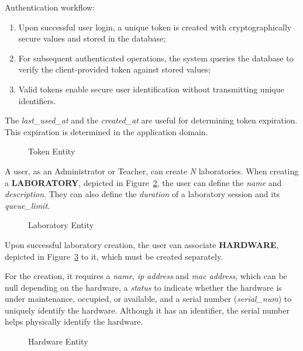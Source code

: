 Authentication workflow:

\begin{enumerate}
    \item Upon successful user login, a unique token is created with cryptographically secure values and stored in the database;
    \item For subsequent authenticated operations, the system queries the database to verify the client-provided token against stored values;
    \item Valid tokens enable secure user identification without transmitting unique identifiers.
\end{enumerate}

The \textit{last\_used\_at} and the \textit{created\_at} are useful for determining token expiration. This expiration is determined in the application domain.

\begin{figure}[H]
    \centering
    
    \caption{Token Entity}
    \label{fig:token_entity}
\end{figure}

A user, as an Administrator or Teacher, can create \textit{N} laboratories. When creating a \textbf{LABORATORY}, depicted in Figure~\ref{fig:laboratory_entity}, the user can define the \textit{name} and \textit{description}. They can also define the \textit{duration} of a laboratory session and its \textit{queue\_limit}.

\begin{figure}[H]
    \centering
    
    \caption{Laboratory Entity}
    \label{fig:laboratory_entity}
\end{figure}

Upon successful laboratory creation, the user can associate \textbf{HARDWARE}, depicted in Figure~\ref{fig:hardware_entity} to it, which must be created separately.

For the creation, it requires a \textit{name}, \textit{\ac{ip} address} and \textit{\ac{mac} address}, which can be null depending on the hardware, a \textit{status} to indicate whether the hardware is under maintenance, occupied, or available, and a serial number (\textit{serial\_num}) to uniquely identify the hardware. Although it has an identifier, the serial number helps physically identify the hardware.

\begin{figure}[H]
    \centering
    
    \caption{Hardware Entity}
    \label{fig:hardware_entity}
\end{figure}

